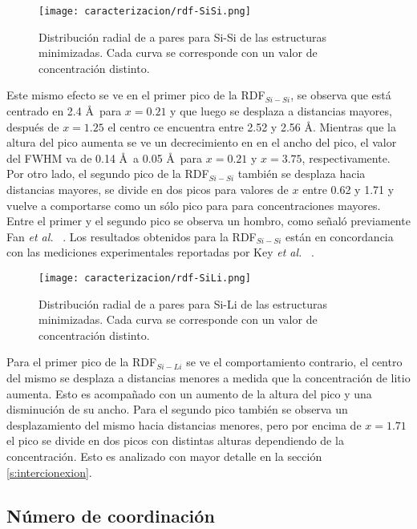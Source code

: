 \begin{figure}[h!]
    \centering
    \texttt{[image: caracterizacion/rdf-SiSi.png]}
    \caption{Distribución radial de a pares para Si-Si de las estructuras 
    minimizadas. Cada curva se corresponde con un valor de concentración 
    distinto.}
    \label{fig:rdf-SiSi}
\end{figure}
Este mismo efecto se ve en el primer pico de la RDF$_{Si-Si}$, se observa que 
está centrado en 2.4 \AA\ para $x = 0.21$ y que luego se desplaza a distancias
mayores, después de $x = 1.25$ el centro ce encuentra entre 2.52 y 2.56 \AA.
Mientras que la altura del pico aumenta se ve un decrecimiento en en el ancho 
del pico, el valor del FWHM va de 0.14 \AA\ a 0.05 \AA\ para $x = 0.21$ y 
$x = 3.75$, respectivamente. Por otro lado, el segundo pico de la RDF$_{Si-Si}$
también se desplaza hacia distancias mayores, se divide en dos picos para valores 
de $x$ entre 0.62 y 1.71 y vuelve a comportarse como un sólo pico para para 
concentraciones mayores. Entre el primer y el segundo pico se observa un hombro,
como señaló previamente Fan \textit{et al.} ~\cite{fan2013}. Los resultados 
obtenidos para la RDF$_{Si-Si}$ están en concordancia con las mediciones 
experimentales reportadas por Key \textit{et al.} ~\cite{key2011}.

\begin{figure}[h!]
    \centering
    \texttt{[image: caracterizacion/rdf-SiLi.png]}
    \caption{Distribución radial de a pares para Si-Li de las estructuras 
    minimizadas. Cada curva se corresponde con un valor de concentración 
    distinto.}
    \label{fig:rdf-SiLi}
\end{figure}
Para el primer pico de la RDF$_{Si-Li}$ se ve el comportamiento contrario, el 
centro del mismo se desplaza a distancias menores a medida que la concentración
de litio aumenta. Esto es acompañado con un aumento de la altura del pico y una
disminución de su ancho. Para el segundo pico también se observa un desplazamiento
del mismo hacia distancias menores, pero por encima de $x = 1.71$ el pico se
divide en dos picos con distintas alturas dependiendo de la concentración. Esto
es analizado con mayor detalle en la sección \ref{s:intercionexion}.

\subsection{Número de coordinación}

